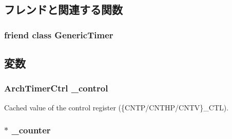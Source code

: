 \subsection{フレンドと関連する関数}
\hypertarget{classGenericTimer_1_1ArchTimer_a2ee40beffc6dffc416498927895820e7}{
\subsubsection[{GenericTimer}]{\setlength{\rightskip}{0pt plus 5cm}friend class {\bf GenericTimer}}}
\label{classGenericTimer_1_1ArchTimer_a2ee40beffc6dffc416498927895820e7}


\subsection{変数}
\hypertarget{classGenericTimer_1_1ArchTimer_ac5f2bc920c716e4c333635c6acc3e928}{
\subsubsection[{\_\-control}]{\setlength{\rightskip}{0pt plus 5cm}ArchTimerCtrl {\bf \_\-control}}}
\label{classGenericTimer_1_1ArchTimer_ac5f2bc920c716e4c333635c6acc3e928}


Cached value of the control register (\{CNTP/CNTHP/CNTV\}\_\-CTL). \hypertarget{classGenericTimer_1_1ArchTimer_a20843f1c5d7b269ec4cd9f246d83e932}{
\subsubsection[{\_\-counter}]{$\ast$ {\bf \_\-counter}}}
\label{classGenericTimer_1_1ArchTimer_a20843f1c5d7b269ec4cd9f246d83e932}


